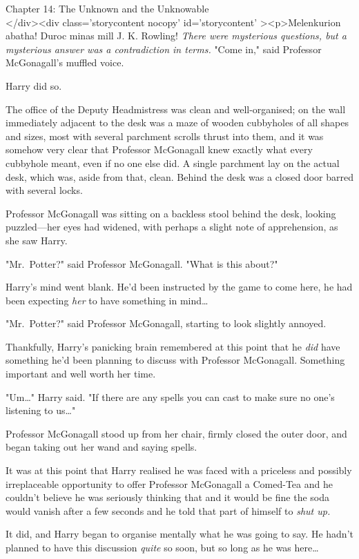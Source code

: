 
Chapter 14: The Unknown and the Unknowable\\
</div><div  class='storycontent nocopy' id='storycontent' ><p>Melenkurion 
abatha! Duroc minas mill J. K. Rowling!
\sbreak
\emph{There were mysterious questions, but a mysterious answer was a 
contradiction in terms.}
\sbreak
"Come in," said Professor McGonagall's muffled voice.

Harry did so.

The office of the Deputy Headmistress was clean and well-organised; on the wall 
immediately adjacent to the desk was a maze of wooden cubbyholes of all shapes 
and sizes, most with several parchment scrolls thrust into them, and it was 
somehow very clear that Professor McGonagall knew exactly what every cubbyhole 
meant, even if no one else did. A single parchment lay on the actual desk, 
which was, aside from that, clean. Behind the desk was a closed door barred 
with several locks.

Professor McGonagall was sitting on a backless stool behind the desk, looking 
puzzled---her eyes had widened, with perhaps a slight note of apprehension, as 
she saw Harry.

"Mr.~Potter?" said Professor McGonagall. "What is this about?"

Harry's mind went blank. He'd been instructed by the game to come here, he had 
been expecting \emph{her} to have something in mind{\ldots}

"Mr.~Potter?" said Professor McGonagall, starting to look slightly annoyed.

Thankfully, Harry's panicking brain remembered at this point that he \emph{did} 
have something he'd been planning to discuss with Professor McGonagall. 
Something important and well worth her time.

"Um{\ldots}" Harry said. "If there are any spells you can cast to make sure no 
one's listening to us{\ldots}"

Professor McGonagall stood up from her chair, firmly closed the outer door, and 
began taking out her wand and saying spells.

It was at this point that Harry realised he was faced with a priceless and 
possibly irreplaceable opportunity to offer Professor McGonagall a Comed-Tea 
and he couldn't believe he was seriously thinking that and it would be fine the 
soda would vanish after a few seconds and he told that part of himself to 
\emph{shut up.}

It did, and Harry began to organise mentally what he was going to say. He 
hadn't planned to have this discussion \emph{quite} so soon, but so long as he 
was here{\ldots}

